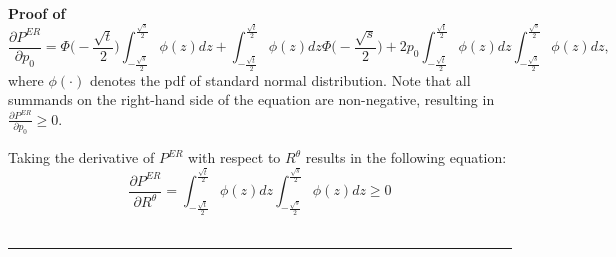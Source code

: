 \documentclass[12pt]{article}
\newenvironment{proof}[1][Proof of]{\noindent\textbf{#1} }{\ \rule{0.5em}{0.5em}}
\begin{document}
\begin{proof}
    \begin{equation*}
        \frac{\partial P^{ER}}{\partial p_0} 
        = 
        \Phi\bigg(-\frac{\sqrt{t}}{2}\bigg)
        \int_{-\frac{\sqrt{s}}{2}}^{\frac{\sqrt{s}}{2}} \phi(z)dz 
        +
        \int_{-\frac{\sqrt{t}}{2}}^{\frac{\sqrt{t}}{2}} \phi(z)dz
        \Phi\bigg(-\frac{\sqrt{s}}{2}\bigg)
        +
        2p_0
        \int_{-\frac{\sqrt{t}}{2}}^{\frac{\sqrt{t}}{2}} \phi(z)dz
        \int_{-\frac{\sqrt{s}}{2}}^{\frac{\sqrt{s}}{2}} \phi(z)dz,
    \end{equation*}
    where $\phi(\cdot)$ denotes the pdf of standard normal distribution. Note that all summands on the right-hand side of the equation are non-negative, resulting in $\frac{\partial P^{ER}}{\partial p_0} \geq 0$.

    Taking the derivative of $P^{ER}$ with respect to $R^\theta$ results in the following equation:
    \begin{equation*}
        \frac{\partial P^{ER}}{\partial R^\theta} 
        = 
        \int_{-\frac{\sqrt{t}}{2}}^{\frac{\sqrt{t}}{2}} \phi(z)dz
        \int_{-\frac{\sqrt{s}}{2}}^{\frac{\sqrt{s}}{2}} \phi(z)dz
        \geq
        0
    \end{equation*}
\end{proof}
\end{document}
